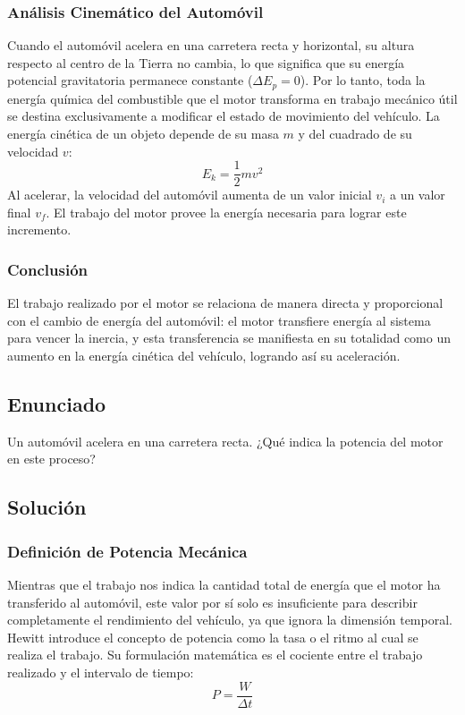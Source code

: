 \documentclass[a4paper,12pt]{article}
\begin{document}
\subsubsection*{Análisis Cinemático del Automóvil}
Cuando el automóvil acelera en una carretera recta y horizontal, su altura respecto al centro de la Tierra no cambia, lo que significa que su energía potencial gravitatoria permanece constante ($\Delta E_p = 0$). Por lo tanto, toda la energía química del combustible que el motor transforma en trabajo mecánico útil se destina exclusivamente a modificar el estado de movimiento del vehículo. La energía cinética de un objeto depende de su masa $m$ y del cuadrado de su velocidad $v$:
$$E_k = \frac{1}{2} m v^2$$
Al acelerar, la velocidad del automóvil aumenta de un valor inicial $v_i$ a un valor final $v_f$. El trabajo del motor provee la energía necesaria para lograr este incremento.

\subsubsection*{Conclusión}
El trabajo realizado por el motor se relaciona de manera directa y proporcional con el cambio de energía del automóvil: el motor transfiere energía al sistema para vencer la inercia, y esta transferencia se manifiesta en su totalidad como un aumento en la energía cinética del vehículo, logrando así su aceleración.

\newpage
\subsection*{Enunciado}
Un automóvil acelera en una carretera recta. 
¿Qué indica la potencia del motor en este proceso?

\subsection*{Solución}

\subsubsection*{Definición de Potencia Mecánica}
Mientras que el trabajo nos indica la cantidad total de energía que el motor ha transferido al automóvil, este valor por sí solo es insuficiente para describir completamente el rendimiento del vehículo, ya que ignora la dimensión temporal. Hewitt introduce el concepto de potencia como la tasa o el ritmo al cual se realiza el trabajo. Su formulación matemática es el cociente entre el trabajo realizado y el intervalo de tiempo:
$$P = \frac{W}{\Delta t}$$
\end{document}

